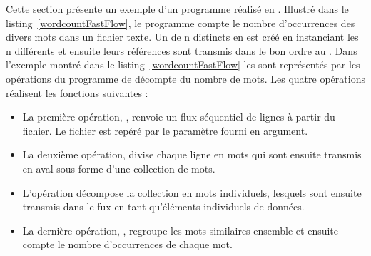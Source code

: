 
Cette section pr\'esente un exemple d'un programme r\'ealis\'e en . Illustr\'e dans le listing~\ref{wordcountFastFlow}, le programme compte le nombre d'occurrences des divers mots dans un fichier texte. Un  de n  distincts en  est cr\'e\'e en instanciant les n diff\'erents  et ensuite leurs r\'ef\'erences sont transmis dans le bon ordre au . Dans l'exemple montr\'e dans le listing~\ref{wordcountFastFlow} les  sont repr\'esent\'es par les op\'erations du programme de d\'ecompte du nombre de mots. Les quatre op\'erations r\'ealisent les fonctions suivantes :

\begin{itemize}
	\item La premi\`ere op\'eration, , renvoie un flux s\'equentiel de lignes \`a partir du fichier. Le fichier est rep\'er\'e par le param\`etre  fourni en argument.

	\item La deuxi\`eme op\'eration,  divise chaque ligne en mots qui sont ensuite transmis en aval sous forme d'une collection de mots.
	
	\item L'op\'eration  décompose la collection en mots individuels, lesquels sont ensuite transmis dans le fux en tant qu'éléments individuels de données.
	
	\item La derni\`ere op\'eration, , regroupe les mots similaires ensemble et ensuite compte le nombre d'occurrences de chaque mot.
	
\end{itemize}
